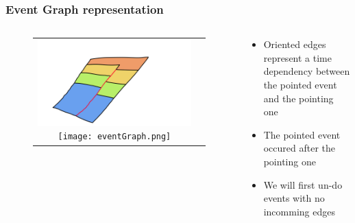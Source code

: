 \documentclass{beamer}
\begin{document}
	\begin{frame}
	\frametitle{Event Graph representation}
	\begin{columns}
	\begin{column}{0.55\textwidth}
	\begin{figure}[H]
	\centering
	\begin{tabular}{@{}cc@{}}
	\vspace*{2cm}
	\includegraphics[width=.73\textwidth]{unFaultSedDescription.png}
	\texttt{[image: eventGraph.png]}\\
	\end{tabular}
	\end{figure}
	\end{column}
	\begin{column}{0.55\textwidth}
	\begin{itemize}
	\item Oriented edges represent a time dependency between the pointed event and the pointing one
	\item The pointed event occured after the pointing one
	\item We will first un-do events with no incomming edges
	\end{itemize}
	\end{column}
	\end{columns}
	\end{frame}
			
\end{document}
